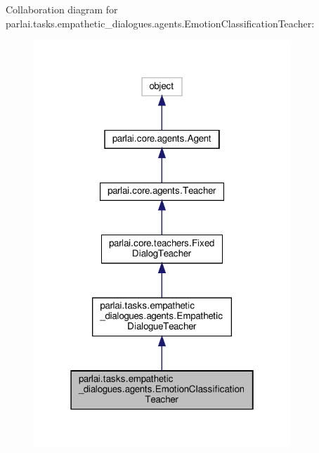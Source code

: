 Collaboration diagram for parlai.\+tasks.\+empathetic\+\_\+dialogues.\+agents.\+Emotion\+Classification\+Teacher\+:
\nopagebreak
\begin{figure}[H]
\begin{center}
\leavevmode
\includegraphics[width=274pt]{d5/d70/classparlai_1_1tasks_1_1empathetic__dialogues_1_1agents_1_1EmotionClassificationTeacher__coll__graph}
\end{center}
\end{figure}

